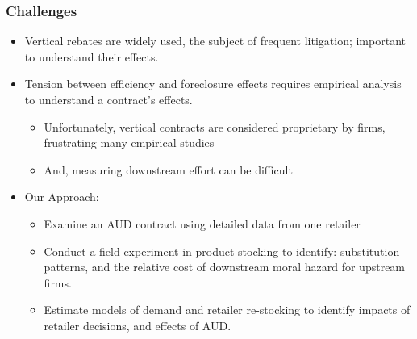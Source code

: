 \begin{frame}\frametitle{Challenges}
\begin{itemize}
\item Vertical rebates are widely used, the subject of frequent litigation; important to understand their effects.
\item Tension between efficiency and foreclosure effects requires empirical analysis to understand a contract's effects.
\begin{itemize}
\item Unfortunately, vertical contracts are considered proprietary by firms, frustrating many empirical studies
\item And, measuring downstream effort can be difficult
\end{itemize}
\item Our Approach:
\begin{itemize}
\item Examine an AUD contract using detailed data from one retailer
\item Conduct a field experiment in product stocking to identify: substitution patterns, and the relative cost of downstream moral hazard for upstream firms.
\item Estimate models of demand and retailer re-stocking to identify impacts of retailer decisions, and effects of AUD.
\end{itemize}
\end{itemize}
\end{frame}

